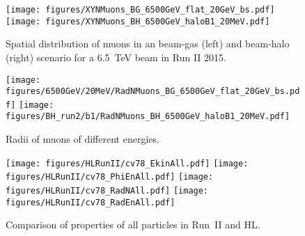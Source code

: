 \begin{figure}
  \centering
    \texttt{[image: figures/XYNMuons\_BG\_6500GeV\_flat\_20GeV\_bs.pdf]}  
    \texttt{[image: figures/XYNMuons\_BH\_6500GeV\_haloB1\_20MeV.pdf]}
  \caption{Spatial distribution of muons in an beam-gas (left) and beam-halo (right) scenario for a 6.5~TeV beam in Run II 2015. 
    \label{fig:XYNMuons2}}
\end{figure}


\clearpage
\begin{figure}
\begin{center}
  \texttt{[image: figures/6500GeV/20MeV/RadNMuons\_BG\_6500GeV\_flat\_20GeV\_bs.pdf]}
  \texttt{[image: figures/BH\_run2/b1/RadNMuons\_BH\_6500GeV\_haloB1\_20MeV.pdf]}      
\end{center}
\vspace{-0.6cm}
 \caption{Radii of muons of different energies.
  \label{fig:PhiEnMuComp}}
\end{figure}

\begin{figure}
\begin{center}
  \texttt{[image: figures/HLRunII/cv78\_EkinAll.pdf]}
  \texttt{[image: figures/HLRunII/cv78\_PhiEnAll.pdf]}
  \texttt{[image: figures/HLRunII/cv78\_RadNAll.pdf]}
  \texttt{[image: figures/HLRunII/cv78\_RadEnAll.pdf]}      
\end{center}
\vspace{-0.6cm}
 \caption{Comparison of properties of all particles in Run~II and HL.
  \label{fig:compHLRun2All}}
\end{figure}
